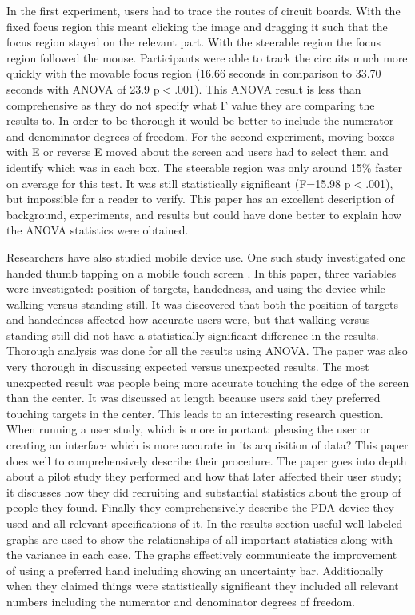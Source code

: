 In the first experiment, users had to trace the routes of circuit boards. With the fixed focus region this meant clicking the image and dragging it such that the focus region stayed on the relevant part. With the steerable region the focus region followed the mouse. Participants were able to track the circuits much more quickly with the movable focus region (16.66 seconds in comparison to 33.70 seconds with ANOVA of 23.9 p$<$.001).  This ANOVA result is less than comprehensive as they do not specify what F value they are comparing the results to.  In order to be thorough it would be better to include the numerator and denominator degrees of freedom. For the second experiment, moving boxes with E or reverse E moved about the screen and users had to select them and identify which was in each box. The steerable region was only around 15\% faster on average for this test. It was still statistically significant (F=15.98 p$<$.001), but impossible for a reader to verify. This paper has an excellent description of background, experiments, and results but could have done better to explain how the ANOVA statistics were obtained. 

Researchers have also studied mobile device use.  One such study investigated one handed thumb tapping on a mobile touch screen \cite{1375725}.  In this paper, three variables were investigated: position of targets, handedness, and using the device while walking versus standing still.  It was discovered that both the position of targets and handedness affected how accurate users were, but that walking versus standing still did not have a statistically significant difference in the results.  Thorough analysis was done for all the results using ANOVA.  The paper was also very thorough in discussing expected versus unexpected results.  The most unexpected result was people being more accurate touching the edge of the screen than the center.  It was discussed at length because users said they preferred touching targets in the center.  
This leads to an interesting research question.  When running a user study, which is more important: pleasing the user or creating an interface which is more accurate in its acquisition of data?
 This paper does well to comprehensively describe their procedure.  The paper goes into depth about a pilot study they performed and how that later affected their user study; it discusses how they did recruiting and substantial statistics about the group of people they found.  Finally they comprehensively describe the PDA device they used and all relevant specifications of it.
  In the results section useful well labeled graphs are used to show the relationships of all important statistics along with the variance in each case.  The graphs effectively communicate the improvement of using a preferred hand including showing an uncertainty bar.  Additionally when they claimed things were statistically significant they included all relevant numbers including the numerator and denominator degrees of freedom.  

